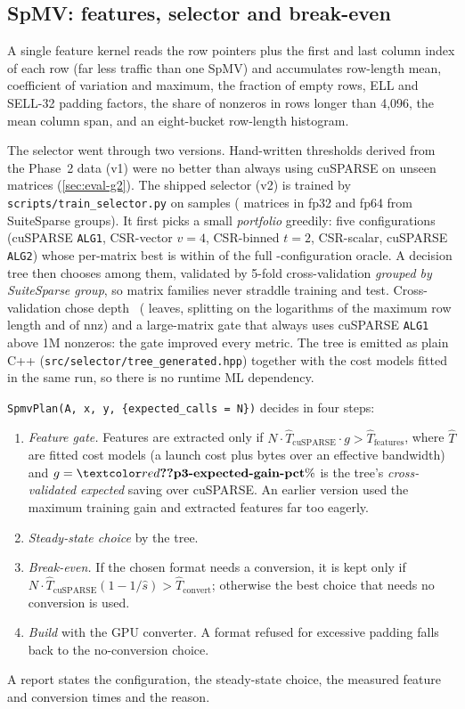 \subsection{SpMV: features, selector and break-even}
A single feature kernel reads the row pointers plus the first and last column index of each row (far less traffic
than one SpMV) and accumulates row-length mean, coefficient of variation and maximum, the fraction of empty rows,
ELL and SELL-32 padding factors, the share of nonzeros in rows longer than 4,096, the mean column span, and an
eight-bucket row-length histogram.

The selector went through two versions. Hand-written thresholds derived from the Phase~2 data (v1) were no better
than always using cuSPARSE on unseen matrices (\cref{sec:eval-g2}). The shipped selector (v2) is trained by
\texttt{scripts/train\_selector.py} on  samples ( matrices in fp32 and
fp64 from  SuiteSparse groups). It first picks a small \emph{portfolio} greedily: five
configurations (cuSPARSE \texttt{ALG1}, CSR-vector $v{=}4$, CSR-binned $t{=}2$, CSR-scalar, cuSPARSE \texttt{ALG2})
whose per-matrix best is within \x{} of the full -configuration oracle. A
decision tree then chooses among them, validated by 5-fold cross-validation \emph{grouped by SuiteSparse group}, so
matrix families never straddle training and test. Cross-validation chose depth~
( leaves, splitting on the logarithms of the maximum row length and of nnz) and a large-matrix
gate that always uses cuSPARSE \texttt{ALG1} above 1M nonzeros: the gate improved every metric. The tree is emitted as
plain C++ (\texttt{src/selector/tree\_generated.hpp}) together with the cost models fitted in the same run, so there
is no runtime ML dependency.

\texttt{SpmvPlan(A, x, y, \{expected\_calls = N\})} decides in four steps:
\begin{enumerate}
\item \emph{Feature gate.} Features are extracted only if
  $N \cdot \hat T_\text{cuSPARSE} \cdot g > \hat T_\text{features}$, where $\hat T$ are fitted cost models (a launch
  cost plus bytes over an effective bandwidth) and $g = \stat{p3-expected-gain-pct}\%$ is the tree's
  \emph{cross-validated expected} saving over cuSPARSE. An earlier version used the maximum training gain
  and extracted features far too eagerly.
\item \emph{Steady-state choice} by the tree.
\item \emph{Break-even.} If the chosen format needs a conversion, it is kept only if
  $N\cdot\hat T_\text{cuSPARSE}(1 - 1/\hat s) > \hat T_\text{convert}$; otherwise the best choice that needs no
  conversion is used.
\item \emph{Build} with the GPU converter. A format refused for excessive padding falls back to the no-conversion choice.
\end{enumerate}
A report states the configuration, the steady-state choice, the measured feature and conversion times and the reason.

